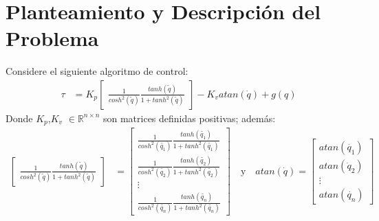 \documentclass[12pt]{article}
\begin{document}
\section{Planteamiento y Descripción del Problema}
Considere el siguiente algoritmo de control:
\begin{equation}
    \begin{split}
        \tau&=K_p
        \begin{bmatrix}
            \frac{1}{cosh^2(\tilde{q})}\frac{tanh(\tilde{q})}{1+tanh^2(\tilde{q})}
        \end{bmatrix}
        -K_vatan(\dot{q})+g(q)
    \end{split}
    \label{eq:tau}
\end{equation}
Donde $K_p$,$K_v$ $\in \mathbb{R}^{n\times n}$ son matrices definidas positivas; además:
\begin{equation}
    \begin{split}
        \begin{bmatrix}
            \frac{1}{cosh^2(\tilde{q})}\frac{tanh(\tilde{q})}{1+tanh^2(\tilde{q})}
        \end{bmatrix}&=
        \begin{bmatrix}
            \frac{1}{cosh^2(\tilde{q_1})}\frac{tanh(\tilde{q_1})}{1+tanh^2(\tilde{q_1})}\\
            \frac{1}{cosh^2(\tilde{q_2})}\frac{tanh(\tilde{q_2})}{1+tanh^2(\tilde{q_2})}\\
            \vdots\\
            \frac{1}{cosh^2(\tilde{q_n})}\frac{tanh(\tilde{q_n})}{1+tanh^2(\tilde{q_n})}
        \end{bmatrix}
        \quad\text{y}\quad
        atan(\dot{q})=
        \begin{bmatrix}
            atan(\dot{q_1})\\
            atan(\dot{q}_2)\\
            \vdots\\
            atan(\dot{q_n})
        \end{bmatrix}\\
    \end{split}
    \label{eq:matrix_form}
\end{equation}
\end{document}
